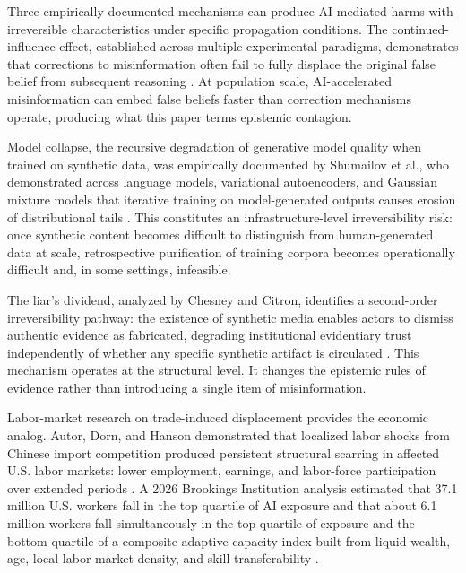 \documentclass[11pt]{article}
\begin{document}
Three empirically documented mechanisms can produce AI-mediated harms with irreversible characteristics under specific propagation conditions. The continued-influence effect, established across multiple experimental paradigms, demonstrates that corrections to misinformation often fail to fully displace the original false belief from subsequent reasoning \parencite{ecker2022,lewandowsky2012}. At population scale, AI-accelerated misinformation can embed false beliefs faster than correction mechanisms operate, producing what this paper terms epistemic contagion.

Model collapse, the recursive degradation of generative model quality when trained on synthetic data, was empirically documented by Shumailov et al., who demonstrated across language models, variational autoencoders, and Gaussian mixture models that iterative training on model-generated outputs causes erosion of distributional tails \parencite{shumailov2024}. This constitutes an infrastructure-level irreversibility risk: once synthetic content becomes difficult to distinguish from human-generated data at scale, retrospective purification of training corpora becomes operationally difficult and, in some settings, infeasible.

The liar's dividend, analyzed by Chesney and Citron, identifies a second-order irreversibility pathway: the existence of synthetic media enables actors to dismiss authentic evidence as fabricated, degrading institutional evidentiary trust independently of whether any specific synthetic artifact is circulated \parencite{chesney2019}. This mechanism operates at the structural level. It changes the epistemic rules of evidence rather than introducing a single item of misinformation.

Labor-market research on trade-induced displacement provides the economic analog. Autor, Dorn, and Hanson demonstrated that localized labor shocks from Chinese import competition produced persistent structural scarring in affected U.S. labor markets: lower employment, earnings, and labor-force participation over extended periods \parencite{autor2013}. A 2026 Brookings Institution analysis estimated that 37.1 million U.S. workers fall in the top quartile of AI exposure and that about 6.1 million workers fall simultaneously in the top quartile of exposure and the bottom quartile of a composite adaptive-capacity index built from liquid wealth, age, local labor-market density, and skill transferability \parencite{brookings2026}.
\end{document}
